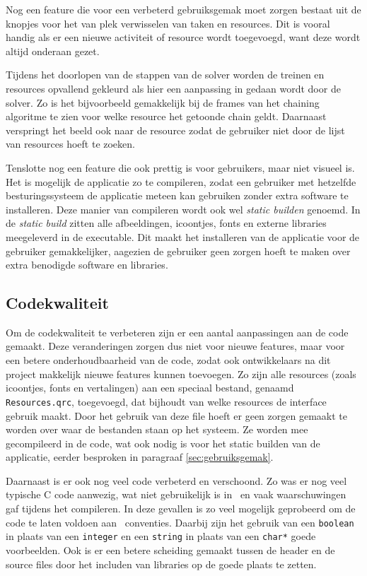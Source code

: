 Nog een feature die voor een verbeterd gebruiksgemak moet zorgen bestaat uit de knopjes voor het van plek verwisselen van taken en resources. Dit is vooral handig als er een nieuwe activiteit of resource wordt toegevoegd, want deze wordt altijd onderaan gezet. 

Tijdens het doorlopen van de stappen van de solver worden de treinen en resources opvallend gekleurd als hier een aanpassing in gedaan wordt door de solver. Zo is het bijvoorbeeld gemakkelijk bij de frames van het chaining algoritme te zien voor welke resource het getoonde chain geldt. Daarnaast verspringt het beeld ook naar de resource zodat de gebruiker niet door de lijst van resources hoeft te zoeken.

Tenslotte nog een feature die ook prettig is voor gebruikers, maar niet visueel is. Het is mogelijk de applicatie zo te compileren, zodat een gebruiker met hetzelfde besturingssysteem de applicatie meteen kan gebruiken zonder extra software te installeren. Deze manier van compileren wordt ook wel \emph{static builden} genoemd. In de \emph{static build} zitten alle afbeeldingen, icoontjes, fonts en externe libraries meegeleverd in de executable. Dit maakt het installeren van de applicatie voor de gebruiker gemakkelijker, aagezien de gebruiker geen zorgen hoeft te maken over extra benodigde software en libraries. 

\subsection{Codekwaliteit}
Om de codekwaliteit te verbeteren zijn er een aantal aanpassingen aan de code gemaakt. Deze veranderingen zorgen dus niet voor nieuwe features, maar voor een betere onderhoudbaarheid van de code, zodat ook ontwikkelaars na dit project makkelijk nieuwe features kunnen toevoegen. Zo zijn alle resources (zoals icoontjes, fonts en vertalingen) aan een speciaal bestand, genaamd \texttt{Resources.qrc}, toegevoegd, dat bijhoudt van welke resources de interface gebruik maakt. Door het gebruik van deze file hoeft er geen zorgen gemaakt te worden over waar de bestanden staan op het systeem. Ze worden mee gecompileerd in de code, wat ook nodig is voor het static builden van de applicatie, eerder besproken in paragraaf \ref{sec:gebruiksgemak}.

Daarnaast is er ook nog veel code verbeterd en verschoond. Zo was er nog veel typische C code aanwezig, wat niet gebruikelijk is in \cpp\ en vaak waarschuwingen gaf tijdens het compileren. In deze gevallen is zo veel mogelijk geprobeerd om de code te laten voldoen aan \cpp\ conventies. Daarbij zijn het gebruik van een \texttt{boolean} in plaats van een \texttt{integer} en een \texttt{string} in plaats van een \texttt{char*} goede voorbeelden. Ook is er een betere scheiding gemaakt tussen de header en de source files door het includen van libraries op de goede plaats te zetten.

